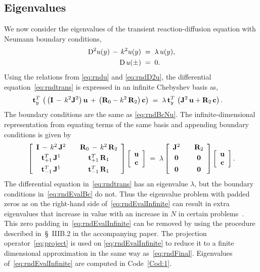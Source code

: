 \documentclass[%
secnumarabic,%
 amssymb, amsmath,%
 aps,prf,superscriptaddress,longbibliography
frontmatterverbose,
]{revtex4-2}
\begin{document}
\subsection{Eigenvalues}
We now consider the eigenvalues of the transient reaction-diffusion equation with Neumann boundary conditions,
\begin{subequations}
  \begin{align}
    \mathrm D^2 u (y) \,-\, k^2 u(y) \;&=\; \lambda\,u(y),
    \label{eq:rndtrans}\\
    \mathrm D\,u(\pm)\;&=\;0.\label{eq:rndEvalBc}
  \end{align}   
\end{subequations}
Using the relations from \eqref{eq:rndu} and \eqref{eq:rndD2u}, the differential equation~\eqref{eq:rndtrans} is expressed in an infinite Chebyshev basis as,
\begin{align}
  \mathbf{t}_y^T\,\left(\,\left(\mathbf I \,-\,k^2\mathbf J^2\right)\mathbf{u} \,+\, \left(\mathbf R_0 - k^2\,\mathbf R_2\right)\mathbf{c}\right) \;&=\; \lambda \, \mathbf{t}_y^T\,\left(\mathbf J^2\,\mathbf{u} + \mathbf R_2\,\mathbf{c}\right).
\end{align}
The boundary conditions are the same as \eqref{eq:rndBcNu}. The infinite-dimensional representation from equating terms of the same basis and appending boundary conditions is given by
\begin{equation}\label{eq:rndEvalInfinite}
  \left[\begin{array}{ccc}
    \mathbf I \, - \, k^2 \, \mathbf J^2 & & \mathbf R_0 \, - \, k^2 \, \mathbf R_2 \\[0.1cm]
    \mathbf{t}_{+1}^T \,\mathbf J^1 & & \mathbf{t}_{+1}^T \, \mathbf R_1 \\[0.15cm]
    \mathbf{t}_{-1}^T \,\mathbf J^1 & & \mathbf{t}_{-1}^T \, \mathbf R_1  \end{array}\right]\left[\begin{array}{c}
    \mathbf{u}\\
    \mathbf{c}
  \end{array}\right] \;=\; \lambda \left[\begin{array}{ccc}
     \mathbf J^2 & & \mathbf R_2 \\[0.1cm]
    \mathbf 0 & & \mathbf 0 \\[0.15cm]
    \mathbf 0 & & \mathbf 0
  \end{array}\right]\left[\begin{array}{c}
    \mathbf{u}\\
    \mathbf{c}
  \end{array}\right].
\end{equation}
The differential equation in~\eqref{eq:rndtrans} has an eigenvalue $\lambda$, but the boundary conditions in~\eqref{eq:rndEvalBc} do not. Thus the eigenvalue problem with padded zeros as on the right-hand side of~\eqref{eq:rndEvalInfinite} can result in extra eigenvalues that increase in value with an increase in $N$ in certain problems~\cite{bourne2003hydrodynamic}. This zero padding in~\eqref{eq:rndEvalInfinite} can be removed by using the procedure described in~\S~IIIB.2 in the accompanying paper. The projection operator~\eqref{eq:project} is used on \eqref{eq:rndEvalInfinite} to reduce it to a finite dimensional approximation in the same way as~\eqref{eq:rndFinal}. Eigenvalues of~\eqref{eq:rndEvalInfinite} are computed in Code~\ref{Cod:1}.
\end{document}
